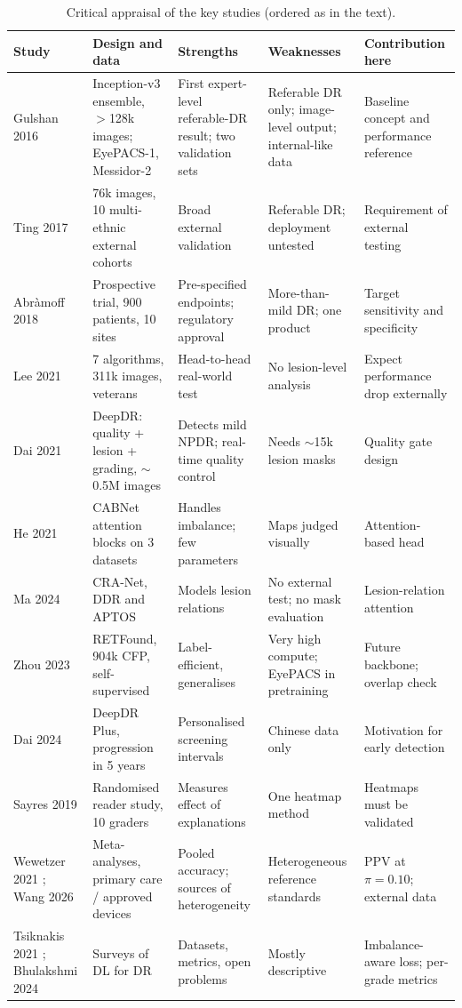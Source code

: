 \documentclass[11pt,a4paper]{article}
\begin{document}
\begin{table}[t]
\centering\scriptsize
\caption{Critical appraisal of the key studies (ordered as in the text).}\label{tab:lr}
\begin{tabular}{@{}p{1.9cm}p{3.4cm}p{3.4cm}p{3.4cm}p{2.9cm}@{}}
\toprule
Study & Design and data & Strengths & Weaknesses & Contribution here\\\midrule
Gulshan 2016 \cite{gulshan2016} & Inception-v3 ensemble, $>$128k images; EyePACS-1, Messidor-2 & First expert-level referable-DR result; two validation sets & Referable DR only; image-level output; internal-like data & Baseline concept and performance reference\\
Ting 2017 \cite{ting2017} & 76k images, 10 multi-ethnic external cohorts & Broad external validation & Referable DR; deployment untested & Requirement of external testing\\
Abr\`amoff 2018 \cite{abramoff2018} & Prospective trial, 900 patients, 10 sites & Pre-specified endpoints; regulatory approval & More-than-mild DR; one product & Target sensitivity and specificity\\
Lee 2021 \cite{lee2021} & 7 algorithms, 311k images, veterans & Head-to-head real-world test & No lesion-level analysis & Expect performance drop externally\\
Dai 2021 \cite{dai2021} & DeepDR: quality + lesion + grading, $\sim$0.5M images & Detects mild NPDR; real-time quality control & Needs $\sim$15k lesion masks & Quality gate design\\
He 2021 \cite{he2021} & CABNet attention blocks on 3 datasets & Handles imbalance; few parameters & Maps judged visually & Attention-based head\\
Ma 2024 \cite{ma2024} & CRA-Net, DDR and APTOS & Models lesion relations & No external test; no mask evaluation & Lesion-relation attention\\
Zhou 2023 \cite{zhou2023} & RETFound, 904k CFP, self-supervised & Label-efficient, generalises & Very high compute; EyePACS in pretraining & Future backbone; overlap check\\
Dai 2024 \cite{dai2024} & DeepDR Plus, progression in 5 years & Personalised screening intervals & Chinese data only & Motivation for early detection\\
Sayres 2019 \cite{sayres2019} & Randomised reader study, 10 graders & Measures effect of explanations & One heatmap method & Heatmaps must be validated\\
Wewetzer 2021 \cite{wewetzer2021}; Wang 2026 \cite{wang2026} & Meta-analyses, primary care / approved devices & Pooled accuracy; sources of heterogeneity & Heterogeneous reference standards & PPV at $\pi=0.10$; external data\\
Tsiknakis 2021 \cite{tsiknakis2021}; Bhulakshmi 2024 \cite{bhulakshmi2024} & Surveys of DL for DR & Datasets, metrics, open problems & Mostly descriptive & Imbalance-aware loss; per-grade metrics\\
\bottomrule
\end{tabular}
\end{table}
\end{document}
